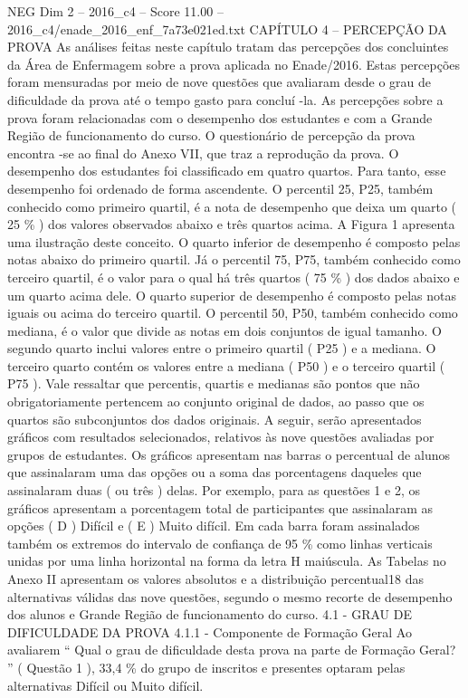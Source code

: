 \begin{textsample}{NEG Dim 2 – 2016\_c4 – Score 11.00 – 2016\_c4/enade\_2016\_enf\_7a73e021ed.txt}  \label{ex:f2_neg_364}
CAPÍTULO 4 – PERCEPÇÃO DA PROVA As análises feitas neste capítulo tratam das percepções dos concluintes da Área de Enfermagem sobre a prova aplicada no Enade/2016.
Estas percepções foram mensuradas por meio de nove questões que avaliaram desde o grau de dificuldade da prova até o tempo gasto para concluí -la.
As percepções sobre a prova foram relacionadas com o desempenho dos estudantes e com a Grande Região de funcionamento do curso.
O questionário de percepção da prova encontra -se ao final do Anexo VII, que traz a reprodução da prova.
O desempenho dos estudantes foi classificado em quatro quartos.
Para tanto, esse desempenho foi ordenado de forma ascendente.
O percentil 25, P25, também conhecido como primeiro quartil, é a nota de desempenho que deixa um quarto ( 25 \% ) dos valores observados abaixo e três quartos acima.
A Figura 1 apresenta uma ilustração deste conceito.
O quarto inferior de desempenho é composto pelas notas abaixo do primeiro quartil.
Já o percentil 75, P75, também conhecido como terceiro quartil, é o valor para o qual há três quartos ( 75 \% ) dos dados abaixo e um quarto acima dele.
O quarto superior de desempenho é composto pelas notas iguais ou acima do terceiro quartil.
O percentil 50, P50, também conhecido como mediana, é o valor que divide as notas em dois conjuntos de igual tamanho.
O segundo quarto inclui valores entre o primeiro quartil ( P25 ) e a mediana.
O terceiro quarto contém os valores entre a mediana ( P50 ) e o terceiro quartil ( P75 ).
Vale ressaltar que percentis, quartis e medianas são pontos que não obrigatoriamente pertencem ao conjunto original de dados, ao passo que os quartos são subconjuntos dos dados originais.
A seguir, serão apresentados gráficos com resultados selecionados, relativos às nove questões avaliadas por grupos de estudantes.
Os gráficos apresentam nas barras o percentual de alunos que assinalaram uma das opções ou a soma das porcentagens daqueles que assinalaram duas ( ou três ) delas.
Por exemplo, para as questões 1 e 2, os gráficos apresentam a porcentagem total de participantes que assinalaram as opções ( D ) Difícil e ( E ) Muito difícil.
Em cada barra foram assinalados também os extremos do intervalo de confiança de 95 \% como linhas verticais unidas por uma linha horizontal na forma da letra H maiúscula.
As Tabelas no Anexo II apresentam os valores absolutos e a distribuição percentual18 das alternativas válidas das nove questões, segundo o mesmo recorte de desempenho dos alunos e Grande Região de funcionamento do curso. 4.1 - GRAU DE DIFICULDADE DA PROVA 4.1.1 - Componente de Formação Geral Ao avaliarem “ Qual o grau de dificuldade desta prova na parte de Formação Geral? ” ( Questão 1 ), 33,4 \% do grupo de inscritos e presentes optaram pelas alternativas Difícil ou Muito difícil.

\end{textsample}

